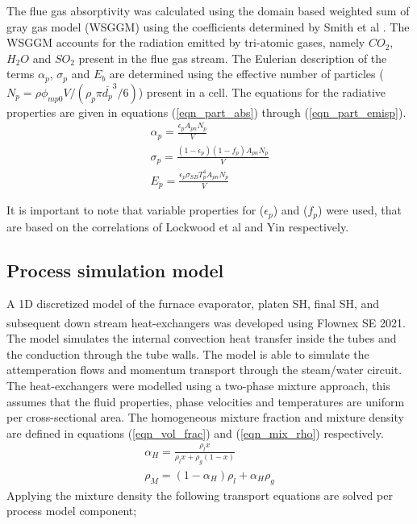 \documentclass[review]{elsarticle}
\begin{document}
The flue gas absorptivity was calculated using the domain based weighted sum of gray gas model (WSGGM) using the coefficients determined by Smith et al \cite{Smith1982}. The WSGGM accounts for the radiation emitted by tri-atomic gases, namely $CO_2$, $H_2O$ and $SO_2$ present in the flue gas stream. The Eulerian description of the terms $\alpha_p$, $\sigma_p$ and $E_b$ are determined using the effective number of particles ($N_p = \rho \phi_{mp0} V / \left( \rho_p \pi \bar{d_p}^3 /6 \right)$) present in a cell. The equations for the radiative properties are given in equations (\ref{eqn_part_abs}) through (\ref{eqn_part_emisp}).
\begin{gather}
\alpha_p = \frac{\epsilon_p A_{pn}N_p}{V} \label{eqn_part_abs}\\
\sigma_p = \frac{(1-\epsilon_p)(1-f_p) A_{pn}N_p}{V} \label{eqn_part_scat} \\
E_p = \frac{\epsilon_p \sigma_{SB} T_p^4 A_{pn}N_p}{V}\label{eqn_part_emisp}
\end{gather}

It is important to note that variable properties for ($\epsilon_p$) and ($f_p$) were used, that are based on the correlations of Lockwood et al \cite{Lockwood1986} and Yin \citep{Yin2015} respectively.

\subsection{Process simulation model}
A 1D discretized model of the furnace evaporator, platen SH, final SH, and subsequent down stream heat-exchangers was developed using Flownex SE\textsuperscript{\textregistered} 2021. The model simulates the internal convection heat transfer inside the tubes and the conduction through the tube walls. The model is able to simulate the attemperation flows and momentum transport through the steam/water circuit. The heat-exchangers were modelled using a two-phase mixture approach, this assumes that the fluid properties, phase velocities and temperatures are uniform per cross-sectional area. The homogeneous mixture fraction and mixture density are defined in equations (\ref{eqn_vol_frac}) and (\ref{eqn_mix_rho}) respectively.
\begin{gather}
\alpha_H = \frac{\rho_l x}{\rho_lx + \rho_g(1-x)} \label{eqn_vol_frac}\\  
\rho_M = (1-\alpha_H)\rho_l + \alpha_H\rho_g \label{eqn_mix_rho}
\end{gather}
Applying the mixture density the following transport equations are solved per process model component;
\end{document}
